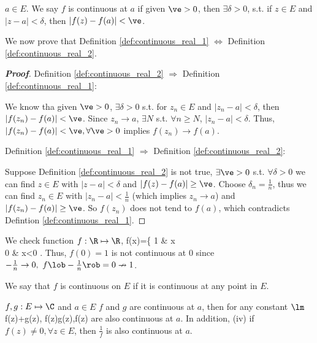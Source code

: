 \begin{definition}[continuity]\label{def:continuous_real_2}
$a\in E$. We say $f$ is continuous at $a$ if given $\ve>0$, then $\exists \delta>0$, s.t. if $z\in E$ and $|z-a|<\delta$, then $|f(z)- f(a)|<\ve$.
\end{definition}

We now prove that Definition \ref{def:continuous_real_1} $\Leftrightarrow$ Definition \ref{def:continuous_real_2}.

\begin{proof}[\bf Proof]
Definition \ref{def:continuous_real_2} $\Rightarrow$ Definition \ref{def:continuous_real_1}:

We know tha given $\ve>0$, $\exists \delta>0$ s.t. for $z_n\in E$ and $|z_n-a|<\delta$, then $|f(z_n)- f(a)|<\ve$. Since $z_n\to a$, $\exists N$ s.t. $\forall n\geq N$, $|z_n-a|<\delta$. Thus, $|f(z_n)- f(a)|<\ve, \forall \ve>0$ implies $f(z_n)\to f(a)$.

Definition \ref{def:continuous_real_1} $\Rightarrow$ Definition \ref{def:continuous_real_2}:

Suppose Definition \ref{def:continuous_real_2} is not true, $\exists \ve>0$ s.t. $\forall \delta>0$ we can find $z\in E$ with $|z-a|<\delta$ and $|f(z)- f(a)|\geq\ve$. Choose $\delta_n=\frac 1n$, thus we can find $z_n\in E$ with $|z_n-a|<\frac 1n$ (which implies $z_n \to a$) and $|f(z_n)- f(a)|\geq\ve$. So $f(z_n)$ does not tend to $f(a)$, which contradicts Defintion \ref{def:continuous_real_1}.
\end{proof}


\begin{example}
We check function $f:\R\mapsto\R$,
\be f(x)=\left\{ 1 & x\\ 0 & x<0
\ea \right. \ee
Thus, $f(0)=1$ is not continuous at 0 since $-\frac 1n\to 0,\ f\lob-\frac 1n\rob=0\nrightarrow 1$.
\end{example}

\begin{definition}\label{def:continuous_rc_on_set}
We say that $f$ is continuous on $E$ if it is continuous at any point in $E$.
\end{definition}


\begin{proposition}\label{pro:basic_continuous_property}
$f,g:E\mapsto \C$ and $a\in E$ $f$ and $g$ are continuous at $a$, then for any constant $\lm$
\be
{}f(z)+g(z),\qquad {} f(z)g(z),\qquad {}\lm f(z)
\ee
are also continuous at $a$. In addition, (iv) if $f(z)\neq 0,\forall z\in E$, then $\frac 1f$ is also continuous at $a$.
\end{proposition}

